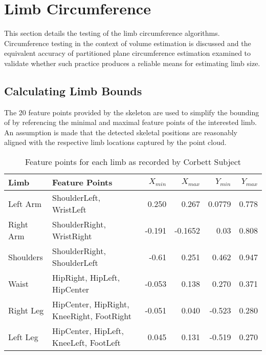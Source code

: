 \section{Limb Circumference}
\label{testing:limb circumference}
This section details the testing of the limb circumference algorithms. Circumference testing in the context of volume estimation is discussed and the equivalent accuracy of partitioned plane circumference estimation examined to validate whether such practice produces a reliable means for estimating limb size.

\subsection{Calculating Limb Bounds}

The 20 feature points provided by the skeleton are used to simplify the bounding of by referencing the minimal and maximal feature points of the interested limb. An assumption is made that the detected skeletal positions are reasonably aligned with the respective limb locations captured by the point cloud. \\

\begin{table}[!htb]
\begin{center}
  \begin{tabular}{| l | p{4cm} | r | r | r | r |}
    \hline
    Limb & Feature Points & $X_{min}$ & $X_{max}$ & $Y_{min}$ & $Y_{max}$ \\ \hline 
    Left Arm & ShoulderLeft, WristLeft & 0.250 & 0.267 & 0.0779 & 0.778  \\ \hline
    Right Arm & ShoulderRight, WristRight & -0.191 & -0.1652 & 0.03 & 0.808  \\ \hline
    Shoulders & ShoulderRight, ShoulderLeft & -0.61 & 0.251 & 0.462 & 0.947 \\ \hline
    Waist & HipRight, HipLeft, HipCenter & -0.053 & 0.138 & 0.270 & 0.371  \\ \hline
    Right Leg & HipCenter, HipRight, KneeRight, FootRight & -0.051 & 0.040 & -0.523 & 0.280  \\ \hline
    Left Leg & HipCenter, HipLeft, KneeLeft, FootLeft & 0.045 & 0.131 & -0.519 & 0.270  \\ \hline
  \end{tabular}
\end{center}
\caption{Feature points for each limb as recorded by Corbett Subject}
\label{testing: feature points used for each limb}
\end{table}

